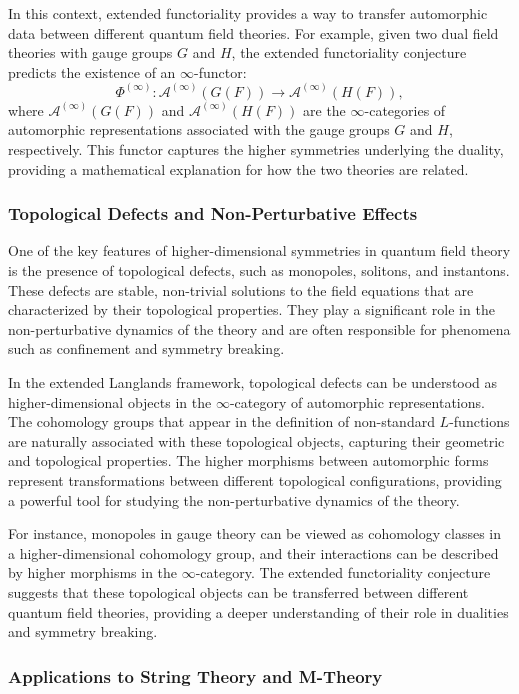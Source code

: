 \documentclass{article}
\theoremstyle{remark}
\begin{document}
In this context, extended functoriality provides a way to transfer automorphic data between different quantum field theories. For example, given two dual field theories with gauge groups $G$ and $H$, the extended functoriality conjecture predicts the existence of an $\infty$-functor:
\[
\Phi^{(\infty)}: \mathcal{A}^{(\infty)}(G(F)) \to \mathcal{A}^{(\infty)}(H(F)),
\]
where $\mathcal{A}^{(\infty)}(G(F))$ and $\mathcal{A}^{(\infty)}(H(F))$ are the $\infty$-categories of automorphic representations associated with the gauge groups $G$ and $H$, respectively. This functor captures the higher symmetries underlying the duality, providing a mathematical explanation for how the two theories are related.

\subsubsection{Topological Defects and Non-Perturbative Effects}

One of the key features of higher-dimensional symmetries in quantum field theory is the presence of topological defects, such as monopoles, solitons, and instantons. These defects are stable, non-trivial solutions to the field equations that are characterized by their topological properties. They play a significant role in the non-perturbative dynamics of the theory and are often responsible for phenomena such as confinement and symmetry breaking.

In the extended Langlands framework, topological defects can be understood as higher-dimensional objects in the $\infty$-category of automorphic representations. The cohomology groups that appear in the definition of non-standard $L$-functions are naturally associated with these topological objects, capturing their geometric and topological properties. The higher morphisms between automorphic forms represent transformations between different topological configurations, providing a powerful tool for studying the non-perturbative dynamics of the theory.

For instance, monopoles in gauge theory can be viewed as cohomology classes in a higher-dimensional cohomology group, and their interactions can be described by higher morphisms in the $\infty$-category. The extended functoriality conjecture suggests that these topological objects can be transferred between different quantum field theories, providing a deeper understanding of their role in dualities and symmetry breaking.

\subsubsection{Applications to String Theory and M-Theory}
\end{document}

